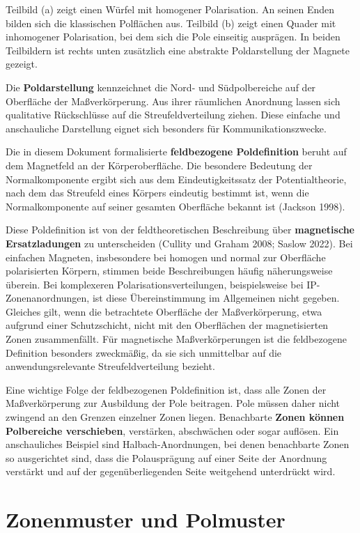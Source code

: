 \documentclass[
  ngerman,
  a4paper,
  twoside]{scrbook}
\begin{document}
Teilbild (a) zeigt einen Würfel mit homogener Polarisation. An seinen
Enden bilden sich die klassischen Polflächen aus. Teilbild (b) zeigt
einen Quader mit inhomogener Polarisation, bei dem sich die Pole
einseitig ausprägen. In beiden Teilbildern ist rechts unten zusätzlich
eine abstrakte Poldarstellung der Magnete gezeigt.

Die \textbf{Poldarstellung} kennzeichnet die Nord- und Südpolbereiche
auf der Oberfläche der Maßverkörperung. Aus ihrer räumlichen Anordnung
lassen sich qualitative Rückschlüsse auf die Streufeldverteilung ziehen.
Diese einfache und anschauliche Darstellung eignet sich besonders für
Kommunikationszwecke.

Die in diesem Dokument formalisierte \textbf{feldbezogene Poldefinition}
beruht auf dem Magnetfeld an der Körperoberfläche. Die besondere
Bedeutung der Normalkomponente ergibt sich aus dem Eindeutigkeitssatz
der Potentialtheorie, nach dem das Streufeld eines Körpers eindeutig
bestimmt ist, wenn die Normalkomponente auf seiner gesamten Oberfläche
bekannt ist (Jackson 1998).

Diese Poldefinition ist von der feldtheoretischen Beschreibung über
\textbf{magnetische Ersatzladungen} zu unterscheiden (Cullity und Graham
2008; Saslow 2022). Bei einfachen Magneten, insbesondere bei homogen und
normal zur Oberfläche polarisierten Körpern, stimmen beide
Beschreibungen häufig näherungsweise überein. Bei komplexeren
Polarisationsverteilungen, beispielsweise bei IP-Zonenanordnungen, ist
diese Übereinstimmung im Allgemeinen nicht gegeben. Gleiches gilt, wenn
die betrachtete Oberfläche der Maßverkörperung, etwa aufgrund einer
Schutzschicht, nicht mit den Oberflächen der magnetisierten Zonen
zusammenfällt. Für magnetische Maßverkörperungen ist die feldbezogene
Definition besonders zweckmäßig, da sie sich unmittelbar auf die
anwendungsrelevante Streufeldverteilung bezieht.

Eine wichtige Folge der feldbezogenen Poldefinition ist, dass alle Zonen
der Maßverkörperung zur Ausbildung der Pole beitragen. Pole müssen daher
nicht zwingend an den Grenzen einzelner Zonen liegen. Benachbarte
\textbf{Zonen können Polbereiche verschieben}, verstärken, abschwächen
oder sogar auflösen. Ein anschauliches Beispiel sind
Halbach-Anordnungen, bei denen benachbarte Zonen so ausgerichtet sind,
dass die Polausprägung auf einer Seite der Anordnung verstärkt und auf
der gegenüberliegenden Seite weitgehend unterdrückt wird.

\section{Zonenmuster und
Polmuster}\label{sec-04-zonenmuster_und_polmuster}
\end{document}
